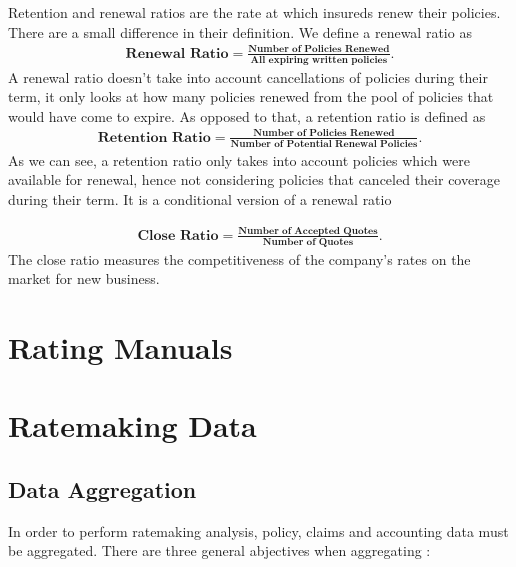 \documentclass[11pt, english]{memoir}
\numberwithin{definition}{section}
\begin{document}
\begin{tcolorbox}[adjusted title = \textbf{Renewal/Retention Ratio}, boxrule = 0mm]
Retention and renewal ratios are the rate at which insureds renew their policies. There are a small difference in their definition. We define a renewal ratio as 
\begin{align*}
\textbf{Renewal Ratio} =  \frac{\textbf{Number of Policies Renewed}}{\textbf{All expiring written policies}}.
\end{align*}
A renewal ratio doesn't take into account cancellations of policies during their term, it only looks at how many policies renewed from the pool of policies that would have come to expire. As opposed to that, a retention ratio is defined as 
\begin{align*}
\textbf{Retention Ratio} = \frac{\textbf{Number of Policies Renewed}}{\textbf{Number of Potential Renewal Policies}}.
\end{align*}
As we can see, a retention ratio only takes into account policies which were available for renewal, hence not considering policies that canceled their coverage during their term. It is a conditional version of a renewal ratio
\end{tcolorbox}


\begin{tcolorbox}[adjusted title = \textbf{Close Ratio}, boxrule = 0mm]
\begin{align*}
\textbf{Close Ratio} = \frac{\textbf{Number of Accepted Quotes}}{\textbf{Number of Quotes}}.
\end{align*}
The close ratio measures the competitiveness of the company's rates on the market for new business. 
\end{tcolorbox}




\chapter{Rating Manuals}

\chapter{Ratemaking Data}

\section{Data Aggregation}
	In order to perform ratemaking analysis, policy, claims and accounting data must be aggregated. There are three general abjectives when aggregating : 
\end{document}
